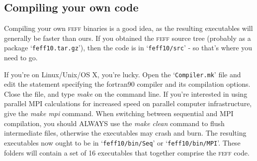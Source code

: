 \documentclass[11pt,oneside]{report} %
\renewcommand{\htmlref}[2]{\hyperlink{#2}{#1}}
\newcommand{\program}[1]{\textsc{#1}}
\newcommand{\feff}{\program{feff}}
\newcommand{\file}[1]{`\texttt{#1}'}
\renewcommand{\htmlref}[2]{{#1}} %
\begin{document}
\begin{latexonly}
%
%
%


\section{Compiling your own code}

Compiling your own {\feff} binaries is a good idea, as the resulting executables will generally be faster than ours.  If you obtained the {\feff} source tree (probably as a package \file{feff10.tar.gz}), then the code is in \file{feff10/src} - so that's where you need to go.

If you're on Linux/Unix/OS X, you're lucky.  Open the \file{Compiler.mk} file and edit the statement specifying the fortran90 compiler and its compilation options.  Close the file, and type {\it make} on the command line.  If you're interested in using parallel MPI calculations for increased speed on parallel computer infrastructure, give the {\it make mpi} command.  When switching between
sequential and MPI compilation, you should ALWAYS use the {\it make clean} command to flush intermediate files, otherwise the executables may crash and burn.
The resulting executables now ought to be in \file{feff10/bin/Seq} or \file{feff10/bin/MPI}.  These folders will contain a set of 16 executables that together comprise the {\feff} code.  




\end{latexonly}
\end{document}
